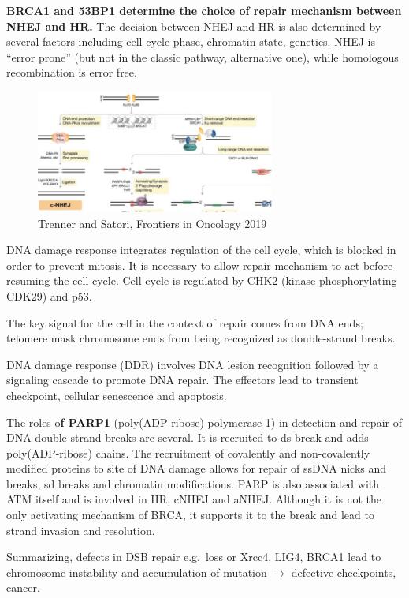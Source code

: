 \textbf{BRCA1 and 53BP1 determine the choice of repair mechanism between NHEJ
and HR.} The decision between NHEJ and HR is also determined by several factors including cell cycle phase, chromatin state, genetics. NHEJ is ``error prone'' (but not in the classic pathway, alternative one), while homologous recombination is error free.

\begin{figure}
\centering
\includegraphics[width=0.7\textwidth]{../_resources/Picture1.jpg}
\caption{Trenner and Satori, Frontiers in Oncology 2019}
\end{figure}

DNA damage response integrates regulation of the cell cycle, which is blocked in order to prevent mitosis. It is necessary to allow repair mechanism to act before resuming the cell cycle. Cell cycle is regulated by CHK2 (kinase phosphorylating CDK29) and p53.

The key signal for the cell in the context of repair comes from DNA ends; telomere mask chromosome ends from being recognized as double-strand breaks.

DNA damage response (DDR) involves DNA lesion recognition followed by a signaling cascade to promote DNA repair. The effectors lead to transient checkpoint, cellular senescence and apoptosis.

The roles o\textbf{f PARP1} (poly(ADP-ribose) polymerase 1) in detection and repair of DNA double-strand breaks are several. It is recruited to ds break and adds poly(ADP-ribose) chains. The recruitment of covalently and non-covalently modified proteins to site of DNA damage allows for repair of ssDNA nicks and breaks, sd breaks and chromatin modifications. PARP is also associated with ATM itself and is involved in HR, cNHEJ and aNHEJ. Although it is not the only activating mechanism of BRCA, it supports it to the break and lead to strand invasion and resolution.

Summarizing, defects in DSB repair e.g.~loss or Xrcc4, LIG4, BRCA1 lead to chromosome instability and accumulation of mutation $\rightarrow$ defective checkpoints, cancer.

